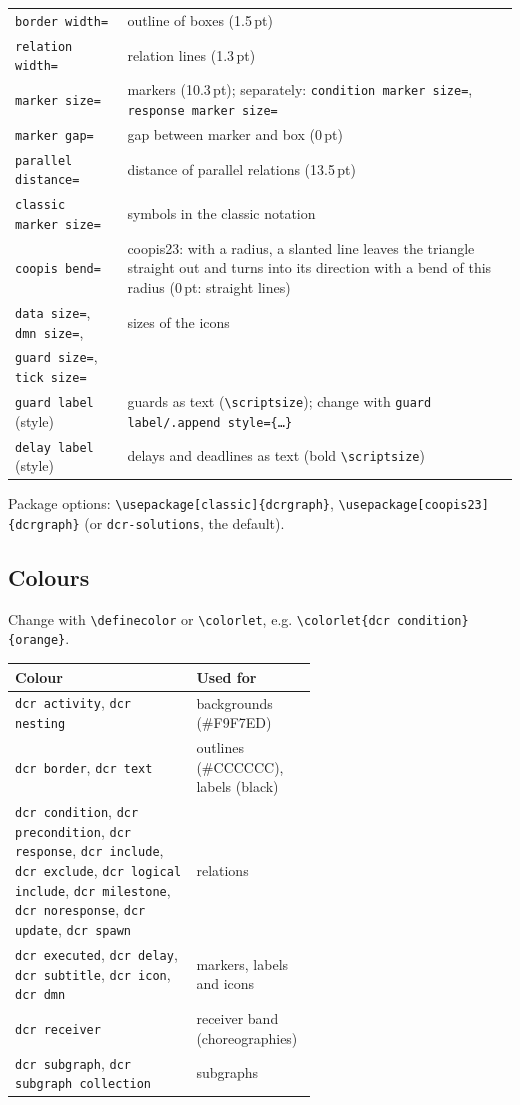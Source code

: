 \documentclass[a4paper,11pt]{article}
\newcommand\cs[1]{\texttt{\textbackslash#1}}
\newcommand\key[1]{\texttt{#1}}
\begin{document}
\begin{tabularx}{\linewidth}{@{}lL@{}}
\key{border width=} & outline of boxes (1.5\,pt)\\
\key{relation width=} & relation lines (1.3\,pt)\\
\key{marker size=} & markers (10.3\,pt); separately:
  \key{condition marker size=}, \key{response marker size=}\\
\key{marker gap=} & gap between marker and box (0\,pt)\\
\key{parallel distance=} & distance of parallel relations (13.5\,pt)\\
\key{classic marker size=} & symbols in the classic notation\\
\key{coopis bend=} & coopis23: with a radius, a slanted line leaves the
  triangle straight out and turns into its direction with a bend of this
  radius (0\,pt: straight lines)\\
\key{data size=}, \key{dmn size=}, & sizes of the icons\\
\key{guard size=}, \key{tick size=} & \\
\key{guard label} (style) & guards as text (\cs{scriptsize}); change with
  \key{guard label/.append style=\{\dots\}}\\
\key{delay label} (style) & delays and deadlines as text (bold \cs{scriptsize})\\
\bottomrule
\end{tabularx}

\medskip\noindent
Package options: \cs{usepackage[classic]\{dcrgraph\}},
\cs{usepackage[coopis23]\{dcrgraph\}} (or \key{dcr-solutions}, the default).

\subsection{Colours}\label{sec:colours}
Change with \cs{definecolor} or \cs{colorlet}, e.g.
\cs{colorlet\{dcr condition\}\{orange\}}.

\medskip
\begin{tabularx}{\linewidth}{@{}>{\raggedright\arraybackslash}p{0.6\linewidth}L@{}}
\toprule
Colour & Used for\\
\midrule
\key{dcr activity}, \key{dcr nesting} & backgrounds (\#F9F7ED)\\
\key{dcr border}, \key{dcr text} & outlines (\#CCCCCC), labels (black)\\
\key{dcr condition}, \key{dcr precondition}, \key{dcr response},
\key{dcr include}, \key{dcr exclude}, \key{dcr logical include},
\key{dcr milestone}, \key{dcr noresponse}, \key{dcr update},
\key{dcr spawn} & relations\\
\key{dcr executed}, \key{dcr delay}, \key{dcr subtitle}, \key{dcr icon},
\key{dcr dmn} & markers, labels and icons\\
\key{dcr receiver} & receiver band (choreographies)\\
\key{dcr subgraph}, \key{dcr subgraph collection} & subgraphs\\
\bottomrule
\end{tabularx}
\end{document}
